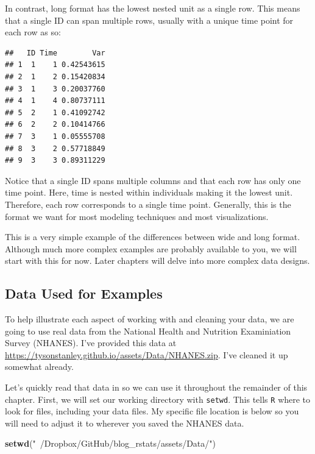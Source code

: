 \documentclass[]{tufte-book}
\newenvironment{Shaded}{}{}
\newcommand{\KeywordTok}[1]{\textcolor[rgb]{0.00,0.44,0.13}{\textbf{#1}}}
\newcommand{\StringTok}[1]{\textcolor[rgb]{0.25,0.44,0.63}{#1}}
\newcommand{\NormalTok}[1]{#1}
\theoremstyle{definition}
\theoremstyle{definition}
\theoremstyle{remark}
\begin{document}
In contrast, long format has the lowest nested unit as a single row.
This means that a single ID can span multiple rows, usually with a
unique time point for each row as so:

\begin{verbatim}
##   ID Time        Var
## 1  1    1 0.42543615
## 2  1    2 0.15420834
## 3  1    3 0.20037760
## 4  1    4 0.80737111
## 5  2    1 0.41092742
## 6  2    2 0.10414766
## 7  3    1 0.05555708
## 8  3    2 0.57718849
## 9  3    3 0.89311229
\end{verbatim}

Notice that a single ID spans multiple columns and that each row has
only one time point. Here, time is nested within individuals making it
the lowest unit. Therefore, each row corresponds to a single time point.
Generally, this is the format we want for most modeling techniques and
most visualizations.

This is a very simple example of the differences between wide and long
format. Although much more complex examples are probably available to
you, we will start with this for now. Later chapters will delve into
more complex data designs.

\subsection*{Data Used for Examples}\label{data-used-for-examples}

To help illustrate each aspect of working with and cleaning your data,
we are going to use real data from the National Health and Nutrition
Examiniation Survey (NHANES). I've provided this data at
\url{https://tysonstanley.github.io/assets/Data/NHANES.zip}. I've
cleaned it up somewhat already.

Let's quickly read that data in so we can use it throughout the
remainder of this chapter. First, we will set our working directory with
\texttt{setwd}. This tells \texttt{R} where to look for files, including
your data files. My specific file location is below so you will need to
adjust it to wherever you saved the NHANES data.

\begin{Shaded}
\begin{Highlighting}[]
\KeywordTok{setwd}\NormalTok{(}\StringTok{"~/Dropbox/GitHub/blog_rstats/assets/Data/"}\NormalTok{)}
\end{Highlighting}
\end{Shaded}
\end{document}

